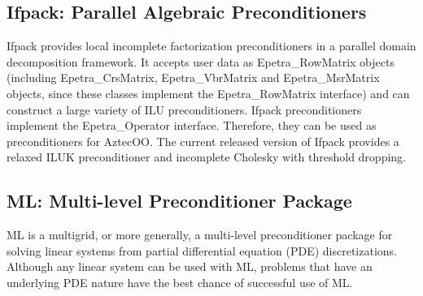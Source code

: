 \documentclass[12pt,relax]{TrilinosOverview}
\begin{document}
\subsection{Ifpack: Parallel Algebraic Preconditioners}

Ifpack provides local incomplete factorization preconditioners in a
parallel domain decomposition framework.  It accepts user data as 
Epetra\_RowMatrix objects (including Epetra\_CrsMatrix, 
Epetra\_VbrMatrix and Epetra\_MsrMatrix objects, since these
classes implement the Epetra\_RowMatrix interface)
and can construct a large variety of ILU preconditioners.  Ifpack 
preconditioners implement the Epetra\_Operator interface.  Therefore, 
they can be used as preconditioners for AztecOO.  The current 
released version of Ifpack provides a relaxed ILUK preconditioner and
incomplete Cholesky with threshold dropping.

\subsection{ML: Multi-level Preconditioner Package}

ML is a multigrid, or more generally, a multi-level preconditioner package for
solving linear systems
from partial differential equation (PDE) discretizations.
Although any linear system can be used with ML,
problems that have an underlying PDE nature have the best chance of successful
use of ML.
\end{document}
